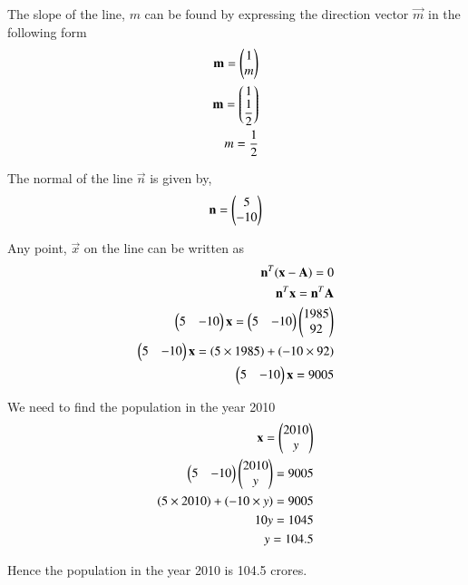 \documentclass[journal,12pt,twocolumn]{IEEEtran}
\begin{document}
\begin{enumerate}
The slope of the line, $m$ can be found by expressing the direction vector $\vec{m}$ in the following form
\begin{align}
\mathbf{m} = \begin{pmatrix}1 \\ m\end{pmatrix} \\
\mathbf{m} = \begin{pmatrix}1 \\ \dfrac{1}{2}\end{pmatrix} \\
m = \dfrac{1}{2}
\end{align}

The normal of the line $\vec{n}$ is given by,
\begin{align}
\mathbf{n} = \begin{pmatrix}5\\ -10\end{pmatrix}
\end{align}

Any point, $\vec{x}$ on the line can be written as
\begin{align}
\mathbf{n}^{T} (\mathbf{x} -\mathbf{A}) = 0 \\
\mathbf{n}^{T} \mathbf{x} = \mathbf{n}^{T}\mathbf{A}\\
\begin{pmatrix}5 & -10\end{pmatrix} \mathbf{x} = \begin{pmatrix}5 & -10\end{pmatrix} \begin{pmatrix}1985\\92\end{pmatrix} \\
\begin{pmatrix}5 & -10\end{pmatrix} \mathbf{x} = (5\times1985) + (-10\times92) \\
\begin{pmatrix}5 & -10\end{pmatrix} \mathbf{x} = 9005
\end{align}

We need to find the population in the year 2010
\begin{align}
\mathbf{x} = \begin{pmatrix}2010\\y\end{pmatrix} \\
\begin{pmatrix}5&-10\end{pmatrix} \begin{pmatrix}2010\\y\end{pmatrix} = 9005 \\
(5\times2010) + (-10\times y) = 9005 \\
10y = 1045 \\
y = 104.5
\end{align}

Hence the population in the year 2010 is 104.5 crores.	
\end{enumerate}
\end{document}
